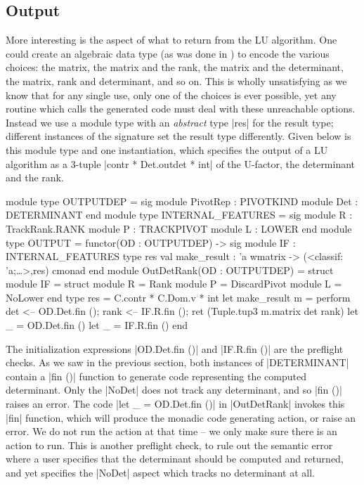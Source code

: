 \documentclass{elsart}
\begin{document}
\subsection{Output}

More interesting is the aspect of what to return
from the LU algorithm.  One could create an algebraic data type (as
was done in \cite{Carette06}) to encode the various choices: the
matrix, the matrix and the rank, the matrix and the determinant, the
matrix, rank and determinant, and so on. This is wholly unsatisfying
as we know that for any single use, only one of the choices is ever
possible, yet any routine which calls the generated code must deal
with these unreachable options.  Instead we use a module type with an
\emph{abstract} type |res| for the result type; different instances of
the signature set the result type differently. Given below is this
module type and one instantiation, which specifies the output of a LU
algorithm as a 3-tuple |contr * Det.outdet * int| of the U-factor, the
determinant and the rank.

\begin{code}
module type OUTPUTDEP = sig 
    module PivotRep : PIVOTKIND 
    module Det      : DETERMINANT
end
module type INTERNAL_FEATURES = sig
  module R      : TrackRank.RANK
  module P      : TRACKPIVOT
  module L      : LOWER
end
module type OUTPUT = functor(OD : OUTPUTDEP) -> sig
  module IF : INTERNAL_FEATURES
  type res
  val make_result : 'a wmatrix -> (<classif: 'a;\dots>,res) cmonad
end
module OutDetRank(OD : OUTPUTDEP) = struct
  module IF = struct
    module R   = Rank
    module P   = DiscardPivot
    module L   = NoLower end
  type res = C.contr * C.Dom.v * int
  let make_result m = perform
    det  <-- OD.Det.fin ();
    rank <-- IF.R.fin ();
    ret (Tuple.tup3 m.matrix det rank)
  let _ = OD.Det.fin ()
  let _ = IF.R.fin ()
end
\end{code}

The initialization expressions |OD.Det.fin ()| and |IF.R.fin ()| are
the preflight checks. As we saw in the previous section, 
both instances of |DETERMINANT| contain a |fin ()| function to generate
code representing the computed determinant. Only the |NoDet| does not
track any determinant, and so |fin ()| raises an error. The code 
|let _ = OD.Det.fin ()| in |OutDetRank| invokes this |fin| function, which will
produce the monadic code generating action, or raise an error. We do
not run the action at that time -- we only make sure there is an
action to run. This is another preflight check, to rule out the
semantic error where a user specifies that the determinant should be computed
and returned, and yet specifies the |NoDet| aspect which tracks no
determinant at all.
\end{document}
